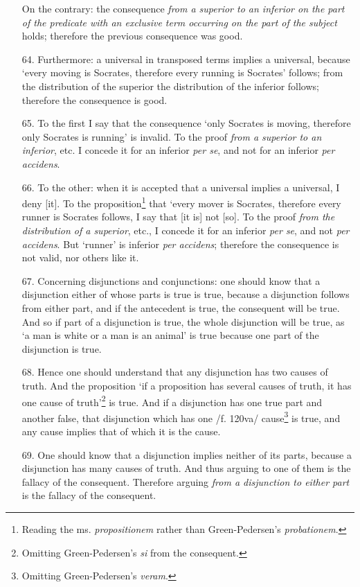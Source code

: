 \begin{enumerate}
On the contrary: the consequence \textit{from a superior to an inferior on the part of the predicate with an exclusive term occurring on the part of the subject} holds; therefore the previous consequence was good.
\item[64.] Furthermore: a universal in transposed terms implies a universal, because `every moving is Socrates, therefore every running is Socrates' follows; from the distribution of the superior the distribution of the inferior follows; therefore the consequence is good.
\item[65.] To the first I say that the consequence `only Socrates is moving, therefore only Socrates is running' is invalid. To the proof \textit{from a superior to an inferior}, etc. I concede it for an inferior \textit{per se}, and not for an inferior \textit{per accidens}.
\item[66.] To the other: when it is accepted that a universal implies a universal, I deny [it]. To the proposition\footnote{Reading the ms. \textit{propositionem} rather than Green-Pedersen's \textit{probationem}.} that `every mover is Socrates, therefore every runner is Socrates follows, I say that [it is] not [so]. To the proof \textit{from the distribution of a superior}, etc., I concede it for an inferior \textit{per se}, and not \textit{per accidens}. But `runner' is inferior \textit{per accidens}; therefore the consequence is not valid, nor others like it. 
\item[67.] Concerning disjunctions and conjunctions: one should know that a disjunction either of whose parts is true is true, because a disjunction follows from either part, and if the antecedent is true, the consequent will be true. And so if part of a disjunction is true, the whole disjunction will be true, as `a man is white or a man is an animal' is true because one part of the disjunction is true.
\item[68.] Hence one should understand that any disjunction has two causes of truth. And the proposition `if a proposition has several causes of truth, it has one cause of truth'\footnote{Omitting Green-Pedersen's \textit{si} from the consequent.} is true. And if a disjunction has one true part and another false, that disjunction which has one /f. 120va/ cause\footnote{Omitting Green-Pedersen's \textit{veram}.} is true, and any cause implies that of which it is the cause.
\item[69.] One should know that a disjunction implies neither of its parts, because a disjunction has many causes of truth. And thus arguing to one of them is the fallacy of the consequent. Therefore arguing \textit{from a disjunction to either part} is the fallacy of the consequent.

\end{enumerate}

